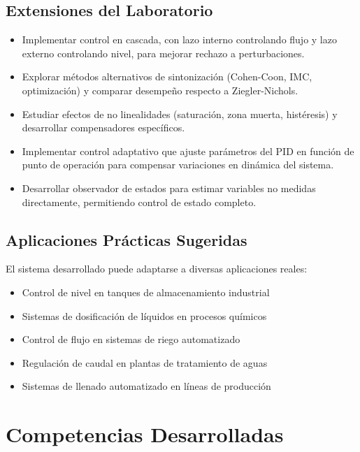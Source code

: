 \documentclass[conference]{IEEEtran}
\begin{document}
\subsection{Extensiones del Laboratorio}

\begin{itemize}
\item Implementar control en cascada, con lazo interno controlando flujo y lazo externo controlando nivel, para mejorar rechazo a perturbaciones.

\item Explorar métodos alternativos de sintonización (Cohen-Coon, IMC, optimización) y comparar desempeño respecto a Ziegler-Nichols.

\item Estudiar efectos de no linealidades (saturación, zona muerta, histéresis) y desarrollar compensadores específicos.

\item Implementar control adaptativo que ajuste parámetros del PID en función de punto de operación para compensar variaciones en dinámica del sistema.

\item Desarrollar observador de estados para estimar variables no medidas directamente, permitiendo control de estado completo.
\end{itemize}

\subsection{Aplicaciones Prácticas Sugeridas}

El sistema desarrollado puede adaptarse a diversas aplicaciones reales:

\begin{itemize}
\item Control de nivel en tanques de almacenamiento industrial
\item Sistemas de dosificación de líquidos en procesos químicos
\item Control de flujo en sistemas de riego automatizado
\item Regulación de caudal en plantas de tratamiento de aguas
\item Sistemas de llenado automatizado en líneas de producción
\end{itemize}

\section{Competencias Desarrolladas}
\end{document}
